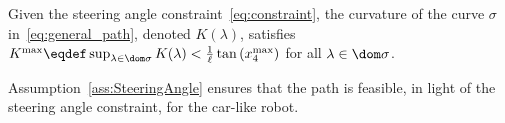 \begin{assumption}
  Given the steering angle constraint~\eqref{eq:constraint}, the
  curvature of the curve $\sigma$ in~\eqref{eq:general_path}, denoted $K(\lambda)$, 
  satisfies
  $
  K^{\max}\eqdef \sup_{\lambda \in \nw{\dom \sigma}} K(\lambda) < \frac{1}{\ell}\tan{(x^{\max}_4)}
  $
for all $\lambda\in\dom \sigma$.
\label{ass:SteeringAngle}
\end{assumption}

Assumption~\ref{ass:SteeringAngle} ensures that the path is feasible,
in light of the steering angle constraint, for the car-like robot.

